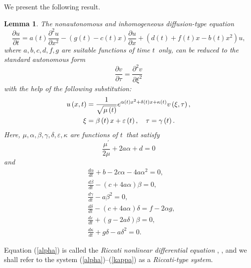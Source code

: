 \documentclass[12pt,reqno]{amsart}
\theoremstyle{plain}
\newtheorem{lemma}{Lemma}
\numberwithin{equation}{section}
\begin{document}
We present the following result.

\begin{lemma}
The nonautonomous and inhomogeneous diffusion-type equation\begin{equation}
\frac{\partial u}{\partial t}=a\left( t\right) \frac{\partial ^{2}u}{\partial x^{2}}-\left( g\left( t\right) -c\left( t\right) x\right) \frac{\partial u}{\partial x}+\left( d\left( t\right) +f\left( t\right) x-b\left(
t\right) x^{2}\right) u,  \label{heat}
\end{equation}where $a,b,c,d,f,g$ are suitable functions of time $t$\ only, can be reduced
to the standard autonomous form\begin{equation}
\frac{\partial v}{\partial \tau }=\frac{\partial ^{2}v}{\partial \xi ^{2}}
\label{standard}
\end{equation}with the help of the following substitution:\begin{align}
u\left( x,t\right) & =\frac{1}{\sqrt{\mu \left( t\right) }}e^{\alpha \left(
t\right) x^{2}+\delta \left( t\right) x+\kappa \left( t\right) }v\left( \xi
,\tau \right) ,  \label{substitution} \\
\xi & =\beta \left( t\right) x+\varepsilon \left( t\right) ,\quad \tau
=\gamma \left( t\right) .  \notag
\end{align}Here, $\mu ,\alpha ,\beta ,\gamma ,\delta ,\varepsilon ,\kappa $ are
functions of $t$\ that satisfy\begin{equation}
\frac{\mu ^{\prime }}{2\mu }+2a\alpha +d=0  \label{mu}
\end{equation}and\begin{align}
& \frac{d\alpha }{dt}+b-2c\alpha -4a\alpha ^{2}=0,  \label{alpha} \\
& \frac{d\beta }{dt}-\left( c+4a\alpha \right) \beta =0,  \label{beta} \\
& \frac{d\gamma }{dt}-a\beta ^{2}=0,  \label{gamma} \\
& \frac{d\delta }{dt}-\left( c+4a\alpha \right) \delta =f-2\alpha g,
\label{delta} \\
& \frac{d\varepsilon }{dt}+\left( g-2a\delta \right) \beta =0,
\label{epsilon} \\
& \frac{d\kappa }{dt}+g\delta -a\delta ^{2}=0.  \label{kappa}
\end{align}
\end{lemma}

Equation (\ref{alpha}) is called the \textit{Riccati nonlinear differential
equation} \cite{Reid72}, \cite{Wa}, \cite{Wh:Wa} and we shall refer to the
system (\ref{alpha})--(\ref{kappa}) as a \textit{Riccati-type system}.
\end{document}

